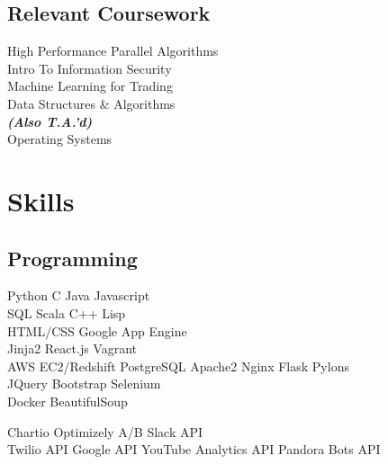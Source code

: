 \documentclass[]{deedy-resume-openfont}
\begin{document}
\begin{minipage}[t]{0.31\textwidth}
\subsection{Relevant Coursework}
High Performance Parallel Algorithms \\
Intro To Information Security \\
Machine Learning for Trading \\
Data Structures \& Algorithms \\
{\footnotesize \textit{\textbf{(Also T.A.'d) }}} \\
Operating Systems
\\[1\baselineskip]


\section{Skills}
\subsection{Programming}

Python \textbullet{}  C   \textbullet{} Java \textbullet{} Javascript 
\\[1\baselineskip]

SQL\textbullet{} Scala \textbullet{}  C++  \textbullet{} Lisp
\\[1\baselineskip]

HTML/CSS \textbullet{} Google App Engine \\
\textbullet{}  Jinja2 \textbullet{} React.js \textbullet{}  Vagrant \\
\textbullet{} AWS EC2/Redshift \textbullet{} PostgreSQL \textbullet{} Apache2 \textbullet{} Nginx \textbullet{} Flask \textbullet{} Pylons
\\[1\baselineskip]

JQuery \textbullet{} Bootstrap \textbullet{}  Selenium \\
\textbullet{} Docker \textbullet{} BeautifulSoup
\sectionsep

Chartio \textbullet{}  Optimizely A/B \textbullet{}  Slack API \\
\textbullet{}  Twilio API \textbullet{}  Google API \textbullet{} YouTube Analytics API \textbullet{} Pandora Bots API
\sectionsep


\end{minipage}
\end{document}
